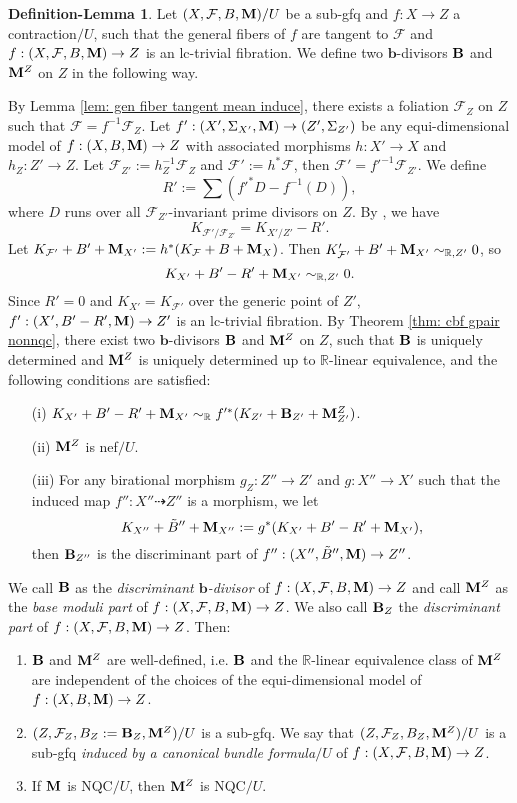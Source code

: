 \documentclass[11pt]{amsart}
\numberwithin{equation}{section}
\newcommand{\bb}{\bm{b}}
\newcommand{\Mm}{{\bf{M}}}
\newcommand{\Rr}{\mathbb{R}}
\newcommand{\Bb}{{\bf{B}}}
\newcommand{\Ff}{\mathcal{F}}
\theoremstyle{definition}
\theoremstyle{definition}
\newtheorem{deflem}[thm]{Definition-Lemma}
\theoremstyle{definition}
\begin{document}
\begin{deflem}\label{deflem: cbf gfq}
    Let $(X,\Ff,B,\Mm)/U$ be a sub-gfq and $f: X\rightarrow Z$ a contraction$/U$, such that the general fibers of $f$ are tangent to $\Ff$ and $f: (X,\Ff,B,\Mm)\rightarrow Z$ is an lc-trivial fibration. We define two $\bb$-divisors $\Bb$ and $\Mm^Z$ on $Z$ in the following way.

 By Lemma \ref{lem: gen fiber tangent mean induce}, there exists a foliation $\Ff_Z$ on $Z$ such that $\Ff=f^{-1}\Ff_Z$. Let $f': (X',\Sigma_{X'},\Mm)\rightarrow (Z',\Sigma_{Z'})$ be any equi-dimensional model of $f: (X,B,\Mm)\rightarrow Z$ with associated morphisms $h: X'\rightarrow X$ and $h_Z: Z'\rightarrow Z$. Let $\Ff_{Z'}:=h_Z^{-1}\Ff_Z$ and $\Ff':=h^*\Ff$, then $\Ff'=f'^{-1}\Ff_{Z'}$. We define
 $$R':=\sum\left(f'^*D-f^{-1}\left(D\right)\right),$$
where $D$ runs over all $\Ff_{Z'}$-invariant prime divisors on $Z$. By \cite[2.9]{Dru17}, we have 
 $$K_{\Ff'/\Ff_{Z'}}=K_{X'/Z'}-R'.$$
Let $K_{\Ff'}+B'+\Mm_{X'}:=h^*(K_{\Ff}+B+\Mm_X)$. Then $K_{\Ff'}'+B'+\Mm_{X'}\sim_{\mathbb R,Z'}0$, so 
$$K_{X'}+B'-R'+\Mm_{X'}\sim_{\mathbb R,Z'}0.$$
Since $R'=0$ and $K_{X'}=K_{\Ff'}$ over the generic point of $Z'$, $f': (X',B'-R',\Mm)\rightarrow Z'$ is an lc-trivial fibration. By Theorem \ref{thm: cbf gpair nonnqc}, there exist two $\bb$-divisors $\Bb$ and $\Mm^Z$ on $Z$, such that $\Bb$ is uniquely determined and $\Mm^Z$ is uniquely determined up to $\Rr$-linear equivalence, and the following conditions are satisfied:
    \begin{enumerate}
        \item[(i)] $K_{X'}+B'-R'+\Mm_{X'}\sim_{\mathbb R}f'^*(K_{Z'}+\Bb_{Z'}+\Mm^Z_{Z'})$.
        \item[(ii)] $\Mm^Z$ is nef$/U$.
        \item[(iii)] For any birational morphism $g_Z: Z''\rightarrow Z'$ and $g: X''\rightarrow X'$ such that the induced map $f'': X''\dashrightarrow Z''$ is a morphism, we let 
        $$K_{X''}+\tilde B''+\Mm_{X''}:=g^*(K_{X'}+B'-R'+\Mm_{X'}),$$ 
        then $\Bb_{Z''}$ is the discriminant part of $f'': (X'',\tilde B'',\Mm)\rightarrow Z''$.
    \end{enumerate}
 We call $\Bb$ as the \emph{discriminant $\bb$-divisor} of $f: (X,\Ff,B,\Mm)\rightarrow Z$ and call $\Mm^Z$ as the \emph{base moduli part} of $f: (X,\Ff,B,\Mm)\rightarrow Z$. We also call $\Bb_Z$ the \emph{discriminant part} of $f: (X,\Ff,B,\Mm)\rightarrow Z$. Then:
    \begin{enumerate}
      \item  $\Bb$ and $\Mm^Z$ are well-defined, i.e. $\Bb$ 
 and the $\Rr$-linear equivalence class of $\Mm^Z$ are independent of the choices of the equi-dimensional model of $f: (X,B,\Mm)\rightarrow Z$.  
 \item $(Z,\Ff_Z,B_Z:=\Bb_Z,\Mm^Z)/U$ is a sub-gfq.  We say that $(Z,\Ff_Z,B_Z,\Mm^Z)/U$ is a sub-gfq \emph{induced by a canonical bundle formula$/U$} of $f: (X,\Ff,B,\Mm)\rightarrow Z$.
 \item If $\Mm$ is NQC$/U$, then $\Mm^Z$ is NQC$/U$.
    \end{enumerate}
\end{deflem}
\end{document}
